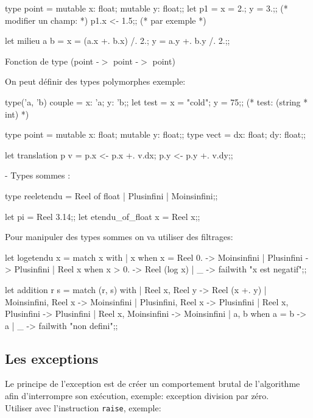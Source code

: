 \documentclass{article}
\newcommand{\code}[1]{\lstinline[style = mystyle]{#1}}
\begin{document}
			\begin{case}
type point = {mutable x: float; mutable y: float};;
let p1 = {x = 2.; y = 3.};;
(* modifier un champ: *)
p1.x <- 1.5;; (* par exemple *)

let milieu a b = {x = (a.x +. b.x) /. 2.; y = a.y +. b.y /. 2.};;
			\end{case}
			
			Fonction de type (point -$>$ point -$>$ point)

			On peut définir des types polymorphes exemple:
			
			\begin{case}[style = mystyle]
type('a, 'b) couple = {x: 'a; y: 'b};;
let test = {x = "cold"; y = 75};;
(* test: (string * int) *)

type point = {mutable x: float; mutable y: float};;
type vect = {dx: float; dy: float};;

let translation p v = 
	p.x <- p.x +. v.dx;
	p.y <- p.y +. v.dy;;
			\end{case}
	
			- Types sommes :

			\begin{case}
type reeletendu = Reel of float | Plusinfini | Moinsinfini;;

let pi = Reel 3.14;;
let etendu_of_float x = Reel x;;
			\end{case}

		Pour manipuler des types sommes on va utiliser des filtrages:

			\begin{case}
let logetendu x = match x with
| x when x = Reel 0. -> Moinsinfini
| Plusinfini -> Plusinfini
| Reel x when x > 0. -> Reel (log x)
| _ -> failwith "x est negatif";;
	
let addition r s = match (r, s) with 
| Reel x, Reel y -> Reel (x +. y)
| Moinsinfini, Reel x -> Moinsinfini
| Plusinfini, Reel x -> Plusinfini
| Reel x, Plusinfini -> Plusinfini
| Reel x, Moinsinfini -> Moinsinfini
| a, b when a = b -> a
| _ -> failwith "non defini";;
			\end{case}
	
		\subsection{Les exceptions}

			Le principe de l'exception est de créer un comportement brutal de l'algorithme afin d'interrompre son exécution, exemple: exception division par zéro.\\
			Utiliser avec l'instruction \code{raise}, exemple:
			
\end{document}
